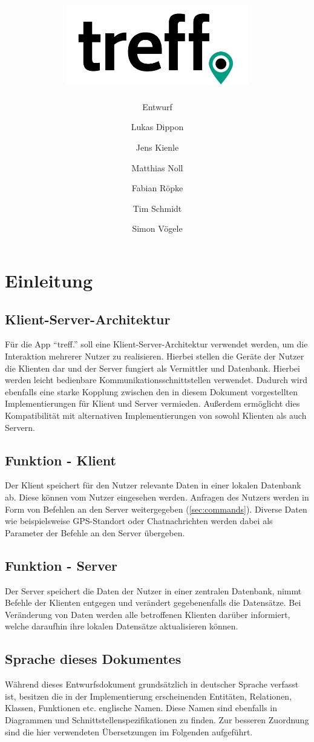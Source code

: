 \documentclass[parskip=full,11pt]{scrartcl}
\title{\includegraphics[width = 80mm]{images/logo_crop.png}}
\subtitle{\huge Entwurf}
\author{Lukas Dippon
        \and Jens Kienle
        \and Matthias Noll
        \and Fabian Röpke
        \and Tim Schmidt
        \and Simon Vögele}
\begin{document}
\maketitle
\thispagestyle{empty} %

\pagebreak
\tableofcontents

\pagebreak
\section{Einleitung}

\subsection{Klient-Server-Architektur}
Für die App \enquote{treff.} soll eine Klient-Server-Architektur verwendet
werden, um die Interaktion mehrerer Nutzer zu realisieren.
Hierbei stellen die Geräte der Nutzer die Klienten dar und der Server
fungiert als Vermittler und Datenbank.
Hierbei werden leicht bedienbare Kommunikationsschnittstellen verwendet.
Dadurch wird ebenfalls eine starke Kopplung zwischen den in diesem Dokument
vorgestellten Implementierungen für Klient und Server vermieden.
Außerdem ermöglicht dies Kompatibilität mit alternativen Implementierungen
von sowohl Klienten als auch Servern.

\subsection{Funktion - Klient}
Der Klient speichert für den Nutzer relevante Daten in einer lokalen Datenbank
ab.
Diese können vom Nutzer eingesehen werden.
Anfragen des Nutzers werden in Form von Befehlen an den Server weitergegeben
(\ref{sec:commands}).
Diverse Daten wie beispielsweise GPS-Standort oder Chatnachrichten werden
dabei als Parameter der Befehle an den Server übergeben.

\subsection{Funktion - Server}
Der Server speichert die Daten der Nutzer in einer zentralen Datenbank, nimmt
Befehle der Klienten entgegen und verändert gegebenenfalls die Datensätze.
Bei Veränderung von Daten werden alle betroffenen Klienten darüber informiert,
welche daraufhin ihre lokalen Datensätze aktualisieren können.

\subsection{Sprache dieses Dokumentes}
Während dieses Entwurfsdokument grundsätzlich in deutscher Sprache verfasst
ist, besitzen die in der Implementierung erscheinenden Entitäten, Relationen,
Klassen, Funktionen etc. englische Namen.
Diese Namen sind ebenfalls in Diagrammen und Schnittstellenspezifikationen
zu finden.
Zur besseren Zuordnung sind die hier verwendeten Übersetzungen im Folgenden
aufgeführt.
\end{document}
